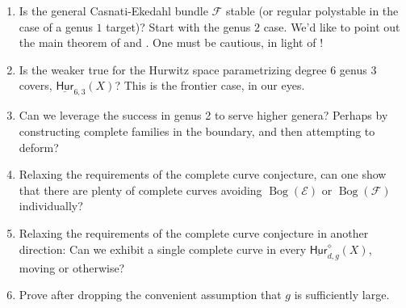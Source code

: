 \documentclass[reqno, 11pt]{amsart}
\DeclareMathOperator{\Bog}{Bog}
\newcommand{\Hurfixed}[2]{\underline{\mathsf{Hur}}_{#1,#2}}
\newcommand{\Hurfixedstable}[2]{\underline{\mathsf{Hur}}_{#1,#2}^{\diamond}}
\begin{document}
\begin{enumerate}
    \item  Is the general Casnati-Ekedahl bundle $\mathcal{F}$ stable (or regular polystable in the case of a genus $1$ target)? Start with the genus $2$ case.  We'd like to point out the main theorem of \cite{bujokas2021invariants} and \cite[Proposition 2.4]{bujokas2021invariants}.  One must be cautious, in light of \cite[Example 2.3]{bujokas2021invariants}!
    \item  Is the weaker  true for the Hurwitz space parametrizing degree $6$ genus $3$ covers, $\Hurfixed{6}{3}(X)$? This is the frontier case, in our eyes.
    \item Can we leverage the success in genus 2 to serve higher genera? Perhaps by constructing complete families in the boundary, and then attempting to deform?
    \item Relaxing the requirements of the complete curve conjecture, can one show that there are plenty of complete curves avoiding $\Bog(\mathcal{E})$ or $\Bog(\mathcal{F})$ individually?
    \item Relaxing the requirements of the complete curve conjecture in another direction: Can we exhibit a single complete curve in every $\Hurfixedstable{d}{g}(X)$, moving or otherwise?
    \item Prove  after dropping the convenient assumption that $g$ is sufficiently large.
\end{enumerate}



  

  
\end{document}
